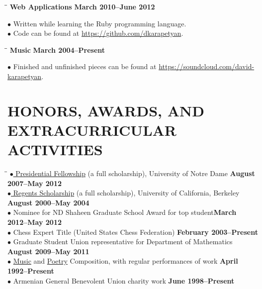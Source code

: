 \documentclass{resume}
\begin{document}
\begin{resume}
    \begin{tabbing}
		\hspace{2.3in}\= \hspace{2.6in}\= \kill
        {\bf Web Applications } \>   
	\>\textbf{March 2010--June 2012} \\
		\> 
	\end{tabbing}\vspace{-15pt}    
$\bullet$
Written while learning the Ruby programming language.
\\
$\bullet$ Code can be found at \href{https://github.com/dkarapetyan}{https://github.com/dkarapetyan}.

\begin{tabbing}
		\hspace{2.3in}\= \hspace{2.6in}\= \kill
        {\bf Music } \>   
	\>\textbf{March 2004--Present} \\
		\> 
	\end{tabbing}\vspace{-15pt}    

$\bullet$ Finished and unfinished pieces can be found at 
\href{https://soundcloud.com/david-karapetyan}{https://soundcloud.com/david-karapetyan}.


	\section{HONORS, AWARDS, AND EXTRACURRICULAR ACTIVITIES} 
	\vspace{-0.1in}
	\begin{tabbing}
	  \hspace{2.3in}\= \hspace{2.6in}\= \kill
    \href{http://graduateschool.nd.edu/admissions/financial-support/prestigious-fellowships/presidential-fellowships-arthur-j-schmitt-fellowships/}{$\bullet$ Presidential
    Fellowship} (a full scholarship), University of Notre Dame \>\> \textbf{August 2007--May 2012} \\
    \href{http://students.berkeley.edu/finaid/undergraduates/types_regents.htm}{$\bullet$ Regents
    Scholarship} (a full scholarship), University of California, 
    Berkeley \>\> \textbf{August 2000--May 2004} \\
$\bullet$ Nominee for ND Shaheen Graduate School Award for top student\>\>\textbf{March 2012--May 2012}
\\
    $\bullet$ Chess Expert Title (United States Chess Federation) \>\>\textbf{February 2003--Present}
    \\
 $\bullet$ Graduate Student Union representative for Department of Mathematics \>\>\textbf{August 2009--May 2011}\\
    $\bullet$ \href{http://davidkarapetyan.com/music.php}{Music} and
    \href{http://davidkarapetyan.com/poetry.php}{Poetry} Composition, with regular
    performances of work \>\> \textbf{April 1992--Present}\\
    $\bullet$ Armenian General Benevolent Union charity work \>\> \textbf{June 1998--Present}\\
      \end{tabbing}

\end{resume}
\end{document}

